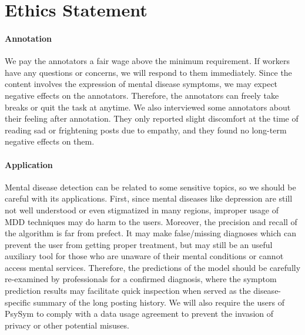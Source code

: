 \section*{Ethics Statement}

\paragraph{Annotation} We pay the annotators a fair wage above the minimum requirement.
If workers have any questions or concerns, we will respond to them immediately. 
Since the content involves the expression of mental disease symptoms, we may expect negative effects on the annotators. Therefore, the annotators can freely take breaks or quit the task at anytime. 
We also interviewed some annotators about their feeling after annotation. They only reported slight discomfort at the time of reading sad or frightening posts due to empathy, and they found no long-term negative effects on them.

\paragraph{Application} Mental disease detection can be related to some sensitive topics, so we should be careful with its applications. First, since mental diseases like depression are still not well understood or even stigmatized in many regions, improper usage of MDD techniques may do harm to the users. Moreover, the precision and recall of the algorithm is far from prefect. It may make false/missing diagnoses which can prevent the user from getting proper treatment, but may still be an useful auxiliary tool for those who are unaware of their mental conditions or cannot access mental services. Therefore, the predictions of the model should be carefully re-examined by professionals for a confirmed diagnosis, where the symptom prediction results may facilitate quick inspection when served as the disease-specific summary of the long posting history. 
We will also require the users of PsySym to comply with a data usage agreement to prevent the invasion of privacy or other potential misuses. 
